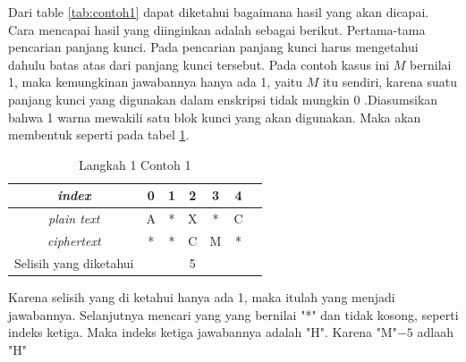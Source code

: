 	 Dari table \ref{tab:contoh1} dapat diketahui bagaimana hasil yang akan dicapai. Cara mencapai hasil yang diinginkan adalah sebagai berikut. Pertama-tama pencarian panjang kunci. Pada pencarian panjang kunci harus mengetahui dahulu batas atas dari panjang kunci tersebut. Pada contoh kasus ini $M$ bernilai 1, maka kemungkinan jawabannya hanya ada 1, yaitu $M$ itu sendiri, karena suatu panjang kunci yang digunakan dalam enskripsi tidak mungkin 0 .Diasumsikan bahwa 1 warna mewakili satu blok kunci yang akan digunakan. Maka akan membentuk seperti pada tabel \ref{tab:langkah1contoh1}.
	 
	\begin{table}[H]
	 	\centering
	 	\setlength{\arrayrulewidth}{.08em}
	 	\begin{tabular}{|c|c|c|c|c|c|c|}\hline
	 	\textit{index}&0&1&2&3&4\\ \hline
	 	\textit{plain text}&\cellcolor{blue!15}A&\cellcolor{lime!15}*&\cellcolor{yellow!25}X&\cellcolor{green!15}*&\cellcolor{pink!25}C\\ \hline
	 	\textit{ciphertext}&\cellcolor{blue!15}*&\cellcolor{lime!15}*&\cellcolor{yellow!25}C&\cellcolor{green!15}M&\cellcolor{pink!25}*\\ \hline
	 	Selisih yang diketahui& & &5& & \\ \hline
	 	\end{tabular}
	 	\caption{Langkah 1 Contoh 1}
	 	\label{tab:langkah1contoh1}
	\end{table}
	
	  Karena selisih yang di ketahui hanya ada 1, maka itulah yang menjadi jawabannya. Selanjutnya mencari yang \plaintext yang bernilai "*" dan \ciphertext tidak kosong, seperti indeks ketiga. Maka indeks ketiga jawabannya adalah "H". Karena "M"$-5$ adlaah "H"
	 
	 
	 
